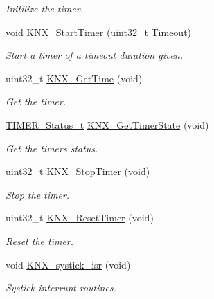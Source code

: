 \begin{DoxyCompactItemize}
\begin{DoxyCompactList}\small\item\em Initilize the timer. \end{DoxyCompactList}\item 
void \hyperlink{group___k_n_x___aux___exported___functions___group2_ga2d2be4d767e87be2cfab3a33c051c9b8}{K\+N\+X\+\_\+\+Start\+Timer} (uint32\+\_\+t Timeout)
\begin{DoxyCompactList}\small\item\em Start a timer of a timeout duration given. \end{DoxyCompactList}\item 
uint32\+\_\+t \hyperlink{group___k_n_x___aux___exported___functions___group2_gab95ee459c86b8b8a0045ab24d45d617b}{K\+N\+X\+\_\+\+Get\+Time} (void)
\begin{DoxyCompactList}\small\item\em Get the timer. \end{DoxyCompactList}\item 
\hyperlink{group___k_n_x___aux___exported___types_ga6ed3d972c6c5995cb3fe41995f121b41}{T\+I\+M\+E\+R\+\_\+\+Status\+\_\+t} \hyperlink{group___k_n_x___aux___exported___functions___group2_ga34d3da57b9d1757a9724693c9e6bbe45}{K\+N\+X\+\_\+\+Get\+Timer\+State} (void)
\begin{DoxyCompactList}\small\item\em Get the timer\textquotesingle{}s status. \end{DoxyCompactList}\item 
uint32\+\_\+t \hyperlink{group___k_n_x___aux___exported___functions___group2_ga44b5f88a0f2b0590924627b428107e97}{K\+N\+X\+\_\+\+Stop\+Timer} (void)
\begin{DoxyCompactList}\small\item\em Stop the timer. \end{DoxyCompactList}\item 
uint32\+\_\+t \hyperlink{group___k_n_x___aux___exported___functions___group2_ga4a1fd53320eeed9eb08d09ec720f3d42}{K\+N\+X\+\_\+\+Reset\+Timer} (void)
\begin{DoxyCompactList}\small\item\em Reset the timer. \end{DoxyCompactList}\item 
void \hyperlink{group___k_n_x___aux___exported___functions___group2_gad9635bb60f2ba98f58874ef46e65c36d}{K\+N\+X\+\_\+systick\+\_\+isr} (void)\hypertarget{group___k_n_x___aux___exported___functions___group2_gad9635bb60f2ba98f58874ef46e65c36d}{}\label{group___k_n_x___aux___exported___functions___group2_gad9635bb60f2ba98f58874ef46e65c36d}

\begin{DoxyCompactList}\small\item\em Systick interrupt routines. \end{DoxyCompactList}\end{DoxyCompactItemize}


